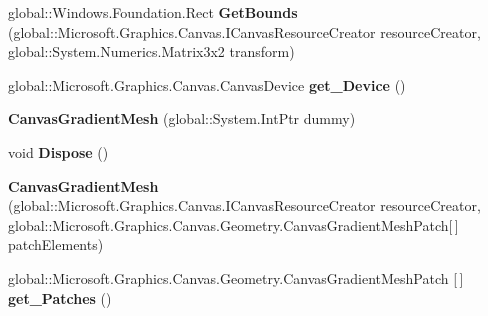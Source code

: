 \begin{DoxyCompactItemize}
\item 
\mbox{\label{class_microsoft_1_1_graphics_1_1_canvas_1_1_geometry_1_1_canvas_gradient_mesh_a446144d0cc83e13b8dab0cb1b480a549}} 
global\+::\+Windows.\+Foundation.\+Rect {\bfseries Get\+Bounds} (global\+::\+Microsoft.\+Graphics.\+Canvas.\+I\+Canvas\+Resource\+Creator resource\+Creator, global\+::\+System.\+Numerics.\+Matrix3x2 transform)
\item 
\mbox{\label{class_microsoft_1_1_graphics_1_1_canvas_1_1_geometry_1_1_canvas_gradient_mesh_aa06489c123c9a773e0a00e8dacd96bfd}} 
global\+::\+Microsoft.\+Graphics.\+Canvas.\+Canvas\+Device {\bfseries get\+\_\+\+Device} ()
\item 
\mbox{\label{class_microsoft_1_1_graphics_1_1_canvas_1_1_geometry_1_1_canvas_gradient_mesh_a7284f7e93f2c21e5bad79e6bbae86e49}} 
{\bfseries Canvas\+Gradient\+Mesh} (global\+::\+System.\+Int\+Ptr dummy)
\item 
\mbox{\label{class_microsoft_1_1_graphics_1_1_canvas_1_1_geometry_1_1_canvas_gradient_mesh_aff29d3a0c6889d589409c3bd3402cb7c}} 
void {\bfseries Dispose} ()
\item 
\mbox{\label{class_microsoft_1_1_graphics_1_1_canvas_1_1_geometry_1_1_canvas_gradient_mesh_a6677d365775f86d865af80a34d58b31d}} 
{\bfseries Canvas\+Gradient\+Mesh} (global\+::\+Microsoft.\+Graphics.\+Canvas.\+I\+Canvas\+Resource\+Creator resource\+Creator, global\+::\+Microsoft.\+Graphics.\+Canvas.\+Geometry.\+Canvas\+Gradient\+Mesh\+Patch\mbox{[}$\,$\mbox{]} patch\+Elements)
\item 
\mbox{\label{class_microsoft_1_1_graphics_1_1_canvas_1_1_geometry_1_1_canvas_gradient_mesh_ad14c223648421f65d2cbd4de1c1b0877}} 
global\+::\+Microsoft.\+Graphics.\+Canvas.\+Geometry.\+Canvas\+Gradient\+Mesh\+Patch \mbox{[}$\,$\mbox{]} {\bfseries get\+\_\+\+Patches} ()
\item 

\end{DoxyCompactItemize}
